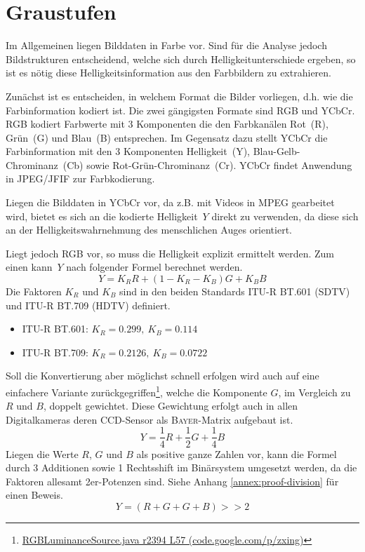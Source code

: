 \section{Graustufen}
\label{sec:grayscale}
\writtenby{\dcauthornameewie}%
Im Allgemeinen liegen Bilddaten in Farbe vor.
Sind für die Analyse jedoch Bildstrukturen entscheidend, welche sich durch Helligkeitunterschiede ergeben, so ist es nötig diese Helligkeitsinformation aus den Farbbildern zu extrahieren.

Zunächst ist es entscheiden, in welchem Format die Bilder vorliegen, d.h. wie die Farbinformation kodiert ist.
Die zwei gängigsten Formate sind RGB und YCbCr.
RGB kodiert Farbwerte mit 3 Komponenten die den Farbkanälen Rot~(R), Grün~(G) und Blau~(B) entsprechen.
Im Gegensatz dazu stellt YCbCr die Farbinformation mit den 3 Komponenten Helligkeit~(Y), Blau-Gelb-Chrominanz~(Cb) sowie Rot-Grün-Chrominanz~(Cr).
YCbCr findet Anwendung in JPEG/JFIF \cite{jfif} zur Farbkodierung.

Liegen die Bilddaten in YCbCr vor, da z.B. mit Videos in MPEG gearbeitet wird, bietet es sich an die kodierte Helligkeit~$Y$ direkt zu verwenden, da diese sich an der Helligkeitswahrnehmung des menschlichen Auges orientiert.

Liegt jedoch RGB vor, so muss die Helligkeit explizit ermittelt werden.
Zum einen kann~$Y$ nach folgender Formel \cite[2.5.1]{itu/rec/601} berechnet werden.
\begin{equation}
  Y = K_R R + (1 - K_R - K_B) G + K_B B
\end{equation}
Die Faktoren $K_R$ und $K_B$ sind in den beiden Standards ITU-R BT.601 (SDTV) und ITU-R BT.709 (HDTV) definiert.
%
\begin{itemize}
\item ITU-R BT.601: $K_R=0.299,~K_B=0.114$ \cite[2.5.1]{itu/rec/601}
\item ITU-R BT.709: $K_R=0.2126,~K_B=0.0722$ \cite[4]{itu/rec/709}
\end{itemize}
%
Soll die Konvertierung aber möglichst schnell erfolgen wird auch auf eine einfachere Variante zurückgegriffen\footnote{\href{https://code.google.com/p/zxing/source/browse/trunk/core/src/com/google/zxing/RGBLuminanceSource.java?spec=svn2633&r=2394\#57}{RGBLuminanceSource.java r2394 L57 (code.google.com/p/zxing)}}, welche die Komponente $G$, im Vergleich zu $R$ und $B$, doppelt gewichtet.
Diese Gewichtung erfolgt auch in allen Digitalkameras deren CCD-Sensor als \textsc{Bayer}-Matrix aufgebaut ist.
\begin{equation}
  Y = \frac{1}{4} R + \frac{1}{2} G + \frac{1}{4}B
\end{equation}
Liegen die Werte $R$, $G$ und $B$ als positive ganze Zahlen vor, kann die Formel durch 3 Additionen sowie 1 Rechtsshift im Binärsystem umgesetzt werden, da die Faktoren allesamt 2er-Potenzen sind.
Siehe Anhang \ref{annex:proof-division} für einen Beweis.
\begin{equation}
  Y = (R + G + G + B) >\!\!> 2
\end{equation}
